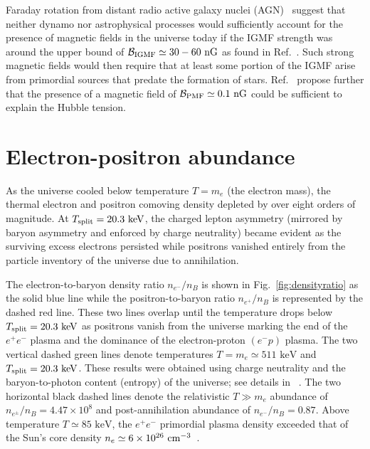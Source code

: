 \documentclass[aps,prd,floatfix,reprint]{revtex4-2}
\newcommand*{\keV}{\text{ keV}}
\newcommand{\rf}[1]{Fig.~{\ref{#1}}}
\begin{document}
Faraday rotation from distant radio active galaxy nuclei (AGN)~\cite{Pomakov:2022cem} suggest that neither dynamo nor astrophysical processes would sufficiently account for the presence of magnetic fields in the universe today if the IGMF strength was around the upper bound of ${\cal B}_{\rm IGMF}\simeq30-60{\rm\ nG}$ as found in Ref.~\cite{Vernstrom:2021hru}. Such strong magnetic fields would then require that at least some portion of the IGMF arise from primordial sources that predate the formation of stars. Ref.~\cite{Jedamzik:2020krr} propose further that the presence of a magnetic field of ${\cal B}_{\rm PMF}\simeq0.1{\rm\ nG}$ could be sufficient to explain the Hubble tension. 

\section{Electron-positron abundance}
\label{sec:abundance}
\noindent As the universe cooled below temperature $T=m_{e}$ (the electron mass), the thermal electron and positron comoving density depleted by over eight orders of magnitude. At $T_{\rm split}=20.3\keV$, the charged lepton asymmetry (mirrored by baryon asymmetry and enforced by charge neutrality) became evident as the surviving excess electrons persisted while positrons vanished entirely from the particle inventory of the universe due to annihilation.

The electron-to-baryon density ratio $n_{e^{-}}/n_{B}$ is shown in \rf{fig:densityratio} as the solid blue line while the positron-to-baryon ratio $n_{e^{+}}/n_{B}$ is represented by the dashed red line. These two lines overlap until the temperature drops below $T_{\rm split}=20.3\keV$ as positrons vanish from the universe marking the end of the $e^{+}e^{-}$ plasma and the dominance of the electron-proton $(e^{-}p)$ plasma. The two vertical dashed green lines denote temperatures $T=m_{e}\simeq511\keV$ and $T_{\rm split}=20.3\keV$. These results were obtained using charge neutrality and the baryon-to-photon content (entropy) of the universe; see details in ~\cite{Rafelski:2023emw}. The two horizontal black dashed lines denote the relativistic $T\gg m_e$ abundance of $n_{e^{\pm}}/n_{B}=4.47\times10^{8}$ and post-annihilation abundance of $n_{e^{-}}/n_{B}=0.87$. Above temperature $T\simeq85\keV$, the $e^{+}e^{-}$ primordial plasma density exceeded that of the Sun's core density $n_{e}\simeq6\times10^{26}{\rm\ cm}^{-3}$~\cite{Bahcall:2000nu}. 
\end{document}
